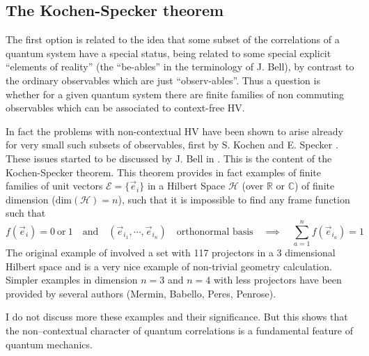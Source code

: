 \subsection{The Kochen-Specker theorem}
The first option is related to the idea that some subset of the correlations of a quantum system have a special status, being related to some special explicit ``elements of reality'' (the ``be-ables'' in the terminology of J. Bell), by contrast to the ordinary observables which are just ``observ-ables''. Thus a question is whether for a given quantum system there are  finite families of non commuting observables which can be associated to context-free HV.

In fact the problems with non-contextual HV have been shown to arise already for very small such subsets of observables, first by S. Kochen and E. Specker \cite{KochenSpecker67}. These issues started to be discussed by J. Bell in
\cite{RevModPhys.38.447}. 
This is the content of the  Kochen-Specker theorem. This theorem provides in fact examples of finite families of unit vectors $\mathcal{E}=\{\vec e_i\}$ in a Hilbert Space $\mathcal{H}$ (over $\mathbb{R}$ or $\mathbb{C}$) of finite dimension ($\mathrm{dim}(\mathcal{H})=n$), such that it is impossible to find any  frame function such that
\begin{equation}
\label{ }
f(\vec e_i)=0\ \text{or}\ 1
\quad\text{and}\quad
(\vec e_{i_1},\cdots, \vec  e_{i_n})\quad\text{orthonormal basis}\quad\implies\quad \sum_{a=1}^n f(\vec e_{i_a})=1
\end{equation}
The original example of \cite{KochenSpecker67} involved a set with 117 projectors in a 3 dimensional Hilbert space and is a very nice example of non-trivial geometry calculation.  Simpler examples in dimension $n=3$ and $n=4$ with less projectors have been provided  by several authors (Mermin, Babello, Peres, Penrose).

I do not discuss more these examples and their significance. But this shows that the non--contextual character of quantum correlations is a fundamental feature of quantum mechanics.

